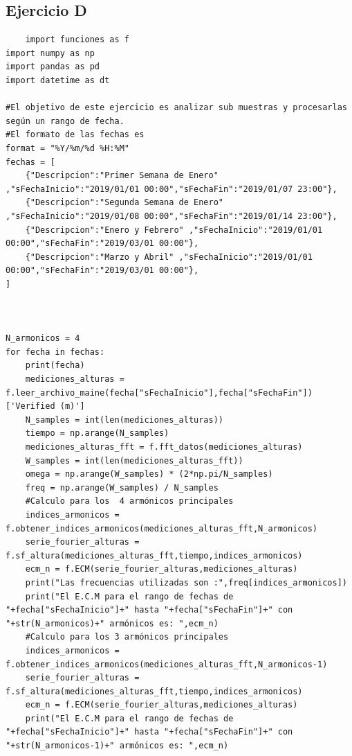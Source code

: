 \documentclass[10pt,a4paper]{article}
\numberwithin{equation}{section}
\numberwithin{figure}{section}
\numberwithin{table}{section}
\begin{document}
\subsection{Ejercicio D}
\begin{verbatim}
    import funciones as f
import numpy as np
import pandas as pd
import datetime as dt

#El objetivo de este ejercicio es analizar sub muestras y procesarlas según un rango de fecha.
#El formato de las fechas es 
format = "%Y/%m/%d %H:%M"
fechas = [
    {"Descripcion":"Primer Semana de Enero" ,"sFechaInicio":"2019/01/01 00:00","sFechaFin":"2019/01/07 23:00"},
    {"Descripcion":"Segunda Semana de Enero" ,"sFechaInicio":"2019/01/08 00:00","sFechaFin":"2019/01/14 23:00"},
    {"Descripcion":"Enero y Febrero" ,"sFechaInicio":"2019/01/01 00:00","sFechaFin":"2019/03/01 00:00"},
    {"Descripcion":"Marzo y Abril" ,"sFechaInicio":"2019/01/01 00:00","sFechaFin":"2019/03/01 00:00"},
]



N_armonicos = 4
for fecha in fechas:
    print(fecha)
    mediciones_alturas = f.leer_archivo_maine(fecha["sFechaInicio"],fecha["sFechaFin"])['Verified (m)']
    N_samples = int(len(mediciones_alturas))
    tiempo = np.arange(N_samples)
    mediciones_alturas_fft = f.fft_datos(mediciones_alturas)
    W_samples = int(len(mediciones_alturas_fft))
    omega = np.arange(W_samples) * (2*np.pi/N_samples)
    freq = np.arange(W_samples) / N_samples
    #Calculo para los  4 armónicos principales
    indices_armonicos = f.obtener_indices_armonicos(mediciones_alturas_fft,N_armonicos)
    serie_fourier_alturas = f.sf_altura(mediciones_alturas_fft,tiempo,indices_armonicos)
    ecm_n = f.ECM(serie_fourier_alturas,mediciones_alturas)
    print("Las frecuencias utilizadas son :",freq[indices_armonicos])
    print("El E.C.M para el rango de fechas de "+fecha["sFechaInicio"]+" hasta "+fecha["sFechaFin"]+" con "+str(N_armonicos)+" armónicos es: ",ecm_n)
    #Calculo para los 3 armónicos principales
    indices_armonicos = f.obtener_indices_armonicos(mediciones_alturas_fft,N_armonicos-1)
    serie_fourier_alturas = f.sf_altura(mediciones_alturas_fft,tiempo,indices_armonicos)
    ecm_n = f.ECM(serie_fourier_alturas,mediciones_alturas)
    print("El E.C.M para el rango de fechas de "+fecha["sFechaInicio"]+" hasta "+fecha["sFechaFin"]+" con "+str(N_armonicos-1)+" armónicos es: ",ecm_n)
    



\end{verbatim}
\end{document}
